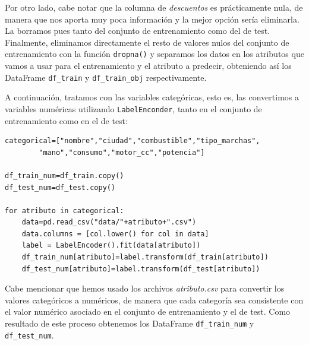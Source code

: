 \documentclass[a4paper,11pt]{article}
\begin{document}
Por otro lado, cabe notar que la columna de \textit{descuentos} es prácticamente nula, de manera que nos aporta muy poca información y la mejor opción sería eliminarla. La borramos pues tanto del conjunto de entrenamiento como del de test. Finalmente, eliminamos directamente el resto de valores nulos  del conjunto de entrenamiento con la función \texttt{dropna()} y separamos los datos en los atributos que vamos a usar para el entrenamiento y el atributo a predecir, obteniendo así los DataFrame \texttt{df_train} y \texttt{df_train_obj} respectivamente. 

A continuación, tratamos con las variables categóricas, esto es, las convertimos a variables numéricas utilizando \texttt{LabelEnconder}, tanto en el conjunto de entrenamiento como en el de test: 
\begin{verbatim}
categorical=["nombre","ciudad","combustible","tipo_marchas",
		"mano","consumo","motor_cc","potencia"]

df_train_num=df_train.copy()
df_test_num=df_test.copy()

for atributo in categorical:
	data=pd.read_csv("data/"+atributo+".csv")
	data.columns = [col.lower() for col in data]
	label = LabelEncoder().fit(data[atributo])
	df_train_num[atributo]=label.transform(df_train[atributo])
	df_test_num[atributo]=label.transform(df_test[atributo])
\end{verbatim}

Cabe mencionar que hemos usado los archivos \textit{atributo.csv} para convertir los valores categóricos a numéricos, de manera que cada categoría sea consistente con el valor numérico asociado en el conjunto de entrenamiento y el de test. Como resultado de este proceso obtenemos los DataFrame \texttt{df_train_num} y \texttt{df_test_num}.
\end{document}
